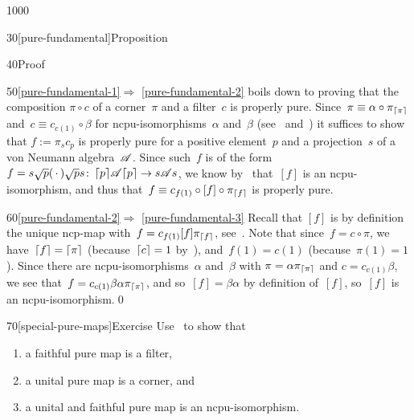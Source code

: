 \begin{parsec}{1000}
\begin{point}{30}[pure-fundamental]{Proposition}
\begin{point}{40}{Proof}
\begin{point}{50}{\ref{pure-fundamental-1}$\Longrightarrow$%
\ref{pure-fundamental-2}}
boils down to proving that the composition
$\pi\circ c$ of a corner~$\pi$ and a filter~$c$
is properly pure.
Since~$\pi\equiv \alpha\circ \pi_{\left\lceil\pi\right\rceil}$
and~$c\equiv c_{c(1)}\circ \beta$
for ncpu-isomorphisms~$\alpha$ and~$\beta$
(see~
and~)
it suffices to show that
$f:=\pi_{s} c_{p}$ is properly pure
for a positive element~$p$ and a projection~$s$
of a von Neumann algebra~$\mathscr{A}$.
Since such~$f$ is of the form $f=s\sqrt{p}(\,\cdot\,)\sqrt{p}s
\colon \left\lceil p\right\rceil\!\mathscr{A}\!\left\lceil p\right\rceil\to s\mathscr{A} s$,
we know by~
that~$[f]$ is an ncpu-isomorphism,
and thus that~$f\equiv c_{f(1)}\circ [f]\circ \pi_{\left\lceil f\right\rceil}$ is properly pure.
\end{point}
\begin{point}{60}{\ref{pure-fundamental-2}$\Longrightarrow$%
\ref{pure-fundamental-3}}%
Recall that $[f]$
is by definition the unique ncp-map
with~$f = c_{f(1)} [f] \pi_{\left\lceil f\right\rceil}$,
see~.
Note that since~$f=c\circ \pi$,
	we have~$\left\lceil f\right\rceil=\left\lceil\pi\right\rceil$ (because~$\left\lceil c\right\rceil=1$ 
	by~),
and~$f(1)=c(1)$ (because~$\pi(1)=1$).
Since there are ncpu-isomorphisms~$\alpha$ and~$\beta$
with $\pi= \alpha \pi_{\left\lceil\pi\right\rceil}$ and  $c=c_{c(1)} \beta$,
we see that~$f=c_{c(1)} \beta\alpha \pi_{\left\lceil\pi\right\rceil}$,
and so~$[f]=\beta\alpha$
by definition of~$[f]$,
so~$[f]$ is an ncpu-isomorphism.\qed
\end{point}
\end{point}
\end{point}
\begin{point}{70}[special-pure-maps]{Exercise}%
Use~ to show that 
\begin{enumerate}
\item
a faithful pure map is a filter,
\item
a unital pure map is a corner, and
\item
a unital and faithful pure map is an ncpu-isomorphism.
\end{enumerate}
\spacingfix
\end{point}%
\end{parsec}%

